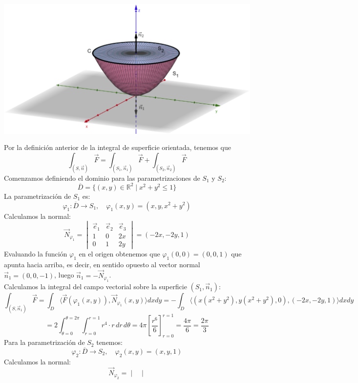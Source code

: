 {    \begin{center}
        \includegraphics[width=0.65\linewidth]{images/borde2.png}
    \end{center}
    Por la definición anterior de la integral de superficie orientada, tenemos que
    \[
        \int_{(S, \vec{n})} \vec{F} = \int_{(S_1, \vec{n}_1)} \vec{F} + \int_{(S_2, \vec{n}_2)} \vec{F}
    \]
    Comenzamos definiendo el dominio para las parametrizaciones de $S_1$ y $S_2$:
    \[
        \overline{D} = \{(x,y) \in \mathbb{R}^2 \mid x^2 + y^2 \leq 1\}
    \]
    La parametrización de $S_1$ es:
    \[
        \varphi_1 : \overline{D} \to S_1, \quad \varphi_1(x,y) = (x, y, x^2 + y^2)
    \]
    Calculamos la normal:
    \[
        \vec{N}_{\varphi_1} =
        \begin{vmatrix}
            \vec{e}_1 & \vec{e}_2 & \vec{e}_3 \\
            1         & 0         & 2x        \\
            0         & 1         & 2y
        \end{vmatrix}
        = (-2x, -2y, 1)
    \]
    Evaluando la función $\varphi_1$ en el origen obtenemos que $\varphi_1(0,0) =
        (0,0,1)$ que apunta hacia arriba, es decir, en sentido opuesto al vector normal
    $\vec{n}_1 = (0,0,-1)$, luego $\vec{n}_1 = -\vec{N}_{\varphi_1}$.\\ Calculamos
    la integral del campo vectorial sobre la superficie $(S_1, \vec{n}_1)$:
    \[
        \int_{(S, \vec{n}_1)} \vec{F} = \int_{D} \langle \vec{F}(\varphi_1(x,y)), \vec{N}_{\varphi_1}(x,y) \rangle dx dy = -\int_{D} \langle (x(x^2+y^2), y(x^2+y^2), 0), (-2x, -2y, 1) \rangle dx dy
    \]
    \[
        = 2\int_{\theta = 0}^{\theta=2\pi} \int_{r=0}^{r=1} r^4 \cdot r \, dr \, d\theta = 4\pi \left[ \frac{r^6}{6} \right]_{r=0}^{r=1} = \frac{4\pi}{6} = \frac{2\pi}{3}
    \]
    Para la parametrización de $S_2$ tenemos:
    \[
        \varphi_2 : \overline{D} \to S_2, \quad \varphi_2(x,y) = (x, y, 1)
    \]
    Calculamos la normal:
    \[
        \vec{N}_{\varphi_2} =
        \begin{vmatrix}

\end{vmatrix}\]}
